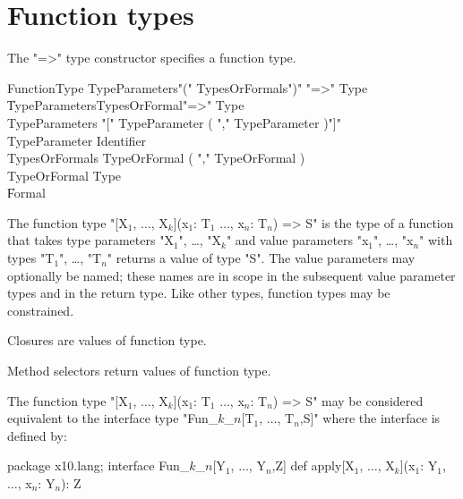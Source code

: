 \section{Function types}

The \xcd"=>" type constructor specifies a function type.

\begin{grammar}
FunctionType \: TypeParameters\opt \xcd"(" TypesOrFormals\opt \xcd")" \xcd"=>" Type  \\
             \| TypeParameters\opt TypesOrFormal\opt \xcd"=>" Type  \\
TypeParameters \: \xcd"[" TypeParameter ( \xcd"," TypeParameter )\star \xcd"]" \\
TypeParameter \: Identifier \\
TypesOrFormals \: TypeOrFormal ( \xcd"," TypeOrFormal )\star \\
TypeOrFormal   \: Type \\
               \| Formal \\
\end{grammar}

The function type
\xcdmath"[X$_1$, $\dots$, X$_k$](x$_1$: T$_1$ $\dots$, x$_n$: T$_n$) => S"
is the type of a function that takes type parameters
\xcdmath"X$_1$", \dots, \xcdmath"X$_k$"
and value parameters
\xcdmath"x$_1$", \dots, \xcdmath"x$_n$"
with types
\xcdmath"T$_1$", \dots, \xcdmath"T$_n$"
returns a value of type \xcd"S".  The value parameters may
optionally be named; these names are in scope in the subsequent
value parameter types and in the return type.
Like other types, function types may be constrained.

Closures are values of function type.

Method selectors return values of function type.

The function type
\xcdmath"[X$_1$, $\dots$, X$_k$](x$_1$: T$_1$ $\dots$, x$_n$: T$_n$) => S"
may be considered equivalent to the interface type
\xcdmath"Fun_$k$_$n$[T$_1$, $\dots$, T$_n$,S]"
where the interface is defined by:
\begin{xtenmath}
package x10.lang;
interface Fun_$k$_$n$[Y$_1$, $\dots$, Y$_n$,Z] {
    def apply[X$_1$, $\dots$, X$_k$](x$_1$: Y$_1$, $\dots$, x$_n$: Y$_n$): Z
}
\end{xtenmath}

